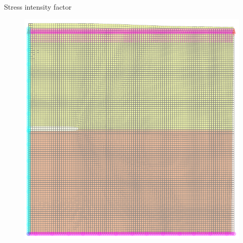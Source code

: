 \documentclass[aspectratio=169,xcolor=dvipsnames]{beamer}
\begin{document}
\begin{frame}{Stress intensity factor}
	\begin{figure}
	\begin{minipage}{0.35\linewidth}
		\begin{minipage}[c]{0.5\linewidth}
	 \fontsize{3pt}{4pt}\selectfont{
	\def\svgwidth{\linewidth}
	}
		\end{minipage}\hfill
		\begin{minipage}[c]{0.5\linewidth}
	 \fontsize{3pt}{4pt}\selectfont{
	\def\svgwidth{\linewidth}
	}
		\end{minipage}\hfill
		\begin{minipage}[c]{0.5\linewidth}
 \fontsize{3pt}{4pt}\selectfont{
	\def\svgwidth{\linewidth}
	}
	\end{minipage}\hfill
	\begin{minipage}[c]{0.5\linewidth}
 \fontsize{3pt}{4pt}\selectfont{
	\def\svgwidth{\linewidth}
	}
	\end{minipage}\hfill
		\begin{minipage}[c]{0.5\linewidth}
	 \fontsize{3pt}{4pt}\selectfont{
	\def\svgwidth{\linewidth}
	}
		\end{minipage}\hfill
		\begin{minipage}[c]{0.5\linewidth}
	 \fontsize{3pt}{4pt}\selectfont{
	\def\svgwidth{\linewidth}
	}
		\end{minipage}\hfill
		\begin{minipage}[c]{0.5\linewidth}
 \fontsize{3pt}{4pt}\selectfont{
	\def\svgwidth{\linewidth}
	}
	\end{minipage}\hfill
	\begin{minipage}[c]{0.5\linewidth}
 \fontsize{3pt}{4pt}\selectfont{
	\def\svgwidth{\linewidth}
	}
	\end{minipage}\hfill
	\end{minipage}
	\begin{minipage}{0.6\linewidth}
		\centering
		\begin{minipage}{0.5\linewidth}
			\centering
\includegraphics[width=0.6\linewidth]{export_iso_slide1.pdf}

\end{minipage}
\end{minipage}
\end{figure}
\end{frame}
\end{document}
